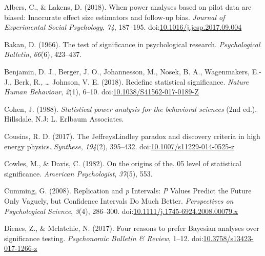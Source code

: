 \documentclass[,jou,floatsintext]{apa6}
\begin{document}
\setlength{\parindent}{-0.5in}
\setlength{\leftskip}{0.5in}

\hypertarget{refs}{}
\leavevmode\hypertarget{ref-albers_when_2018}{}%
Albers, C., \& Lakens, D. (2018). When power analyses based on pilot data are biased: Inaccurate effect size estimators and follow-up bias. \emph{Journal of Experimental Social Psychology}, \emph{74}, 187--195. doi:\href{https://doi.org/10.1016/j.jesp.2017.09.004}{10.1016/j.jesp.2017.09.004}

\leavevmode\hypertarget{ref-bakan_test_1966}{}%
Bakan, D. (1966). The test of significance in psychological research. \emph{Psychological Bulletin}, \emph{66}(6), 423--437.

\leavevmode\hypertarget{ref-benjamin_redefine_2018}{}%
Benjamin, D. J., Berger, J. O., Johannesson, M., Nosek, B. A., Wagenmakers, E.-J., Berk, R., \ldots{} Johnson, V. E. (2018). Redefine statistical significance. \emph{Nature Human Behaviour}, \emph{2}(1), 6--10. doi:\href{https://doi.org/10.1038/S41562-017-0189-Z}{10.1038/S41562-017-0189-Z}

\leavevmode\hypertarget{ref-cohen_statistical_1988}{}%
Cohen, J. (1988). \emph{Statistical power analysis for the behavioral sciences} (2nd ed.). Hillsdale, N.J: L. Erlbaum Associates.

\leavevmode\hypertarget{ref-cousins_jeffreyslindley_2017}{}%
Cousins, R. D. (2017). The JeffreysLindley paradox and discovery criteria in high energy physics. \emph{Synthese}, \emph{194}(2), 395--432. doi:\href{https://doi.org/10.1007/s11229-014-0525-z}{10.1007/s11229-014-0525-z}

\leavevmode\hypertarget{ref-cowles_origins_1982}{}%
Cowles, M., \& Davis, C. (1982). On the origins of the. 05 level of statistical significance. \emph{American Psychologist}, \emph{37}(5), 553.

\leavevmode\hypertarget{ref-cumming_replication_2008}{}%
Cumming, G. (2008). Replication and \emph{p} Intervals: \emph{P} Values Predict the Future Only Vaguely, but Confidence Intervals Do Much Better. \emph{Perspectives on Psychological Science}, \emph{3}(4), 286--300. doi:\href{https://doi.org/10.1111/j.1745-6924.2008.00079.x}{10.1111/j.1745-6924.2008.00079.x}

\leavevmode\hypertarget{ref-dienes_four_2017}{}%
Dienes, Z., \& Mclatchie, N. (2017). Four reasons to prefer Bayesian analyses over significance testing. \emph{Psychonomic Bulletin \& Review}, 1--12. doi:\href{https://doi.org/10.3758/s13423-017-1266-z}{10.3758/s13423-017-1266-z}
\end{document}
